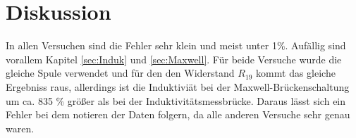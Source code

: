 \section{Diskussion}
\label{sec:Diskussion}
In allen Versuchen sind die Fehler sehr klein und meist unter 1\%. Aufällig sind vorallem Kapitel \ref{sec:Induk} und \ref{sec:Maxwell}. Für beide Versuche wurde die gleiche Spule verwendet und für den den Widerstand $R_{19}$ kommt das gleiche Ergebniss raus, allerdings ist die Induktiviät bei der Maxwell-Brückenschaltung um ca. 835 \% größer als bei der Induktivitätsmessbrücke. Daraus lässt sich ein Fehler bei dem notieren der Daten folgern, da alle anderen Versuche sehr genau waren.   
